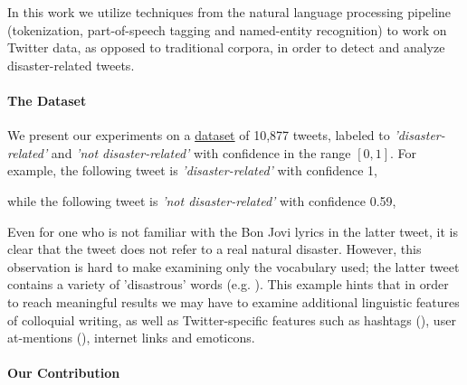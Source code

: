 \documentclass[letterpaper,twocolumn,10pt]{article}
\begin{document}
In this work we utilize techniques from the natural language processing pipeline (tokenization, part-of-speech tagging and named-entity recognition) to work on Twitter data, as opposed to traditional corpora, in order to detect and analyze disaster-related tweets.

\paragraph{The Dataset}
We present our experiments on a \href{https://www.crowdflower.com/data-for-everyone/}{dataset} of 10,877 tweets, labeled to \textit{'disaster-related'} and \textit{'not disaster-related'} with confidence in the range $[0,1]$. For example, the following tweet is \textit{'disaster-related'} with confidence 1,

\begin{center}
	\parbox{190pt}{}
\end{center}


while the following tweet is \textit{'not disaster-related'} with confidence 0.59,

\begin{center}
	\parbox{190pt}{}
\end{center}

Even for one who is not familiar with the Bon Jovi lyrics in the latter tweet, it is clear that the tweet does not refer to a real natural disaster. However, this observation is hard to make examining only the vocabulary used; the latter tweet contains a variety of 'disastrous' words  (e.g. ). This example hints that in order to reach meaningful results we may have to examine additional linguistic features of colloquial writing,  as well as Twitter-specific features such as hashtags (\tweet{\textbf{\#}}), user at-mentions (), internet links and emoticons.


\paragraph{Our Contribution}
\end{document}
